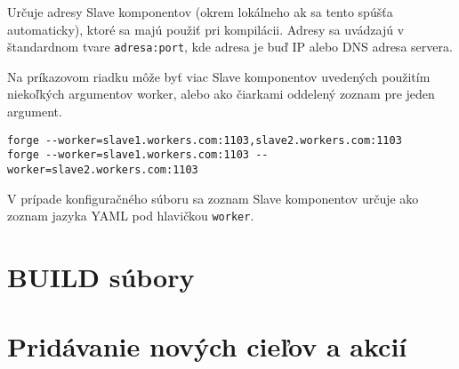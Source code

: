 Určuje adresy Slave komponentov (okrem lokálneho ak sa tento spúšťa automaticky), ktoré
sa majú použiť pri kompilácii. Adresy sa uvádzajú v štandardnom tvare \texttt{adresa:port}, kde
adresa je buď IP alebo DNS adresa servera.

Na príkazovom riadku môže byť viac Slave komponentov uvedených použitím niekoľkých argumentov
worker, alebo ako čiarkami oddelený zoznam pre jeden argument.

\begin{verbatim}
forge --worker=slave1.workers.com:1103,slave2.workers.com:1103
forge --worker=slave1.workers.com:1103 --worker=slave2.workers.com:1103
\end{verbatim}

V prípade konfiguračného súboru sa zoznam Slave komponentov určuje ako
zoznam jazyka YAML pod hlavičkou \texttt{worker}.

\section{BUILD s\'{u}bory}
\label{sec:buildfiles}

\section{Prid\'{a}vanie nov\'{y}ch cie\v{l}ov a akci\'{i}}
\label{sec:contributing}
